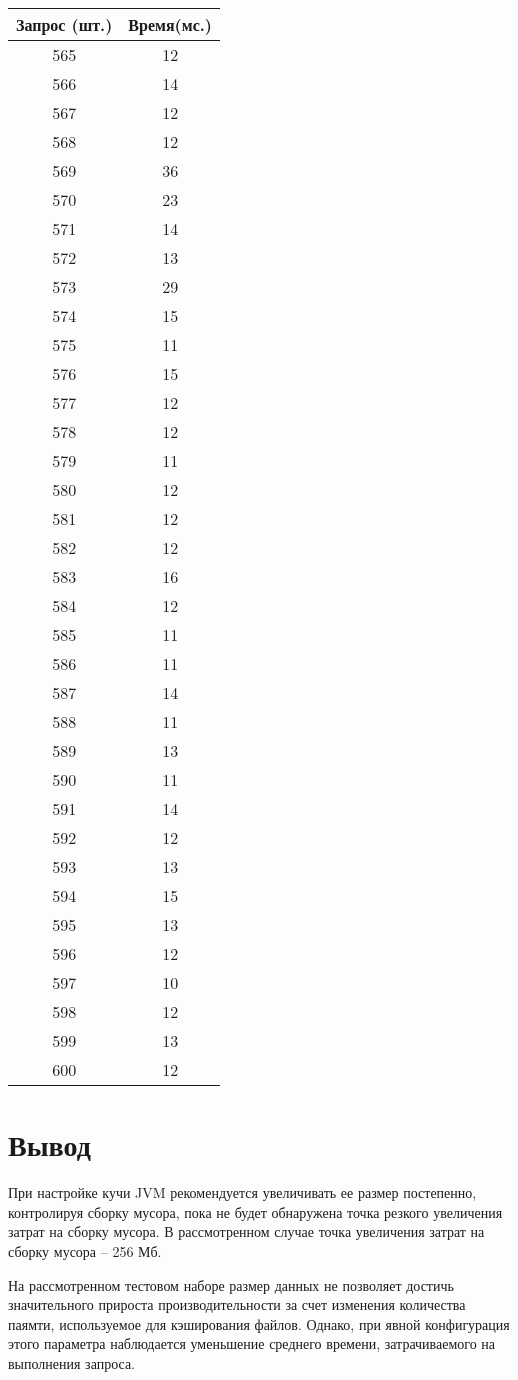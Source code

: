 \begin{table}[H]
\begin{minipage}{.4\textwidth}
		\begin{tabular}{|c|c|}
			\hline
			Запрос (шт.)& Время(мс.) \\
			\hline
			565 & 12 \\
			566 & 14 \\
			567 & 12 \\
			568 & 12 \\
			569 & 36 \\
			570 & 23 \\
			571 & 14 \\
			572 & 13 \\
			573 & 29 \\
			574 & 15 \\
			575 & 11 \\
			576 & 15 \\
			577 & 12 \\
			578 & 12 \\
			579 & 11 \\
			580 & 12 \\
			581 & 12 \\
			582 & 12 \\
			583 & 16 \\
			584 & 12 \\
			585 & 11 \\
			586 & 11 \\
			587 & 14 \\
			588 & 11 \\
			589 & 13 \\
			590 & 11 \\
			591 & 14 \\
			592 & 12 \\
			593 & 13 \\
			594 & 15 \\
			595 & 13 \\
			596 & 12 \\
			597 & 10 \\
			598 & 12 \\
			599 & 13 \\
			600 & 12 \\
			\hline
		\end{tabular}
		\label{tab:с512}
	\end{minipage}
\end{table}
\section{Вывод}

При настройке кучи JVM рекомендуется увеличивать ее размер постепенно, контролируя сборку мусора, пока не будет обнаружена точка резкого увеличения затрат на сборку мусора.\cite{Ян2016} В рассмотренном случае точка увеличения затрат на сборку мусора -- 256 Мб.

На рассмотренном тестовом наборе размер данных не позволяет достичь значительного прироста производительности за счет изменения количества паямти, используемое для  кэширования файлов. Однако, при явной конфигурация этого параметра наблюдается уменьшение среднего времени, затрачиваемого на выполнения запроса.